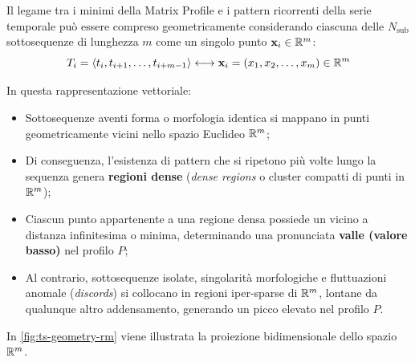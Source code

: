 Il legame tra i minimi della Matrix Profile e i pattern ricorrenti della serie temporale pu\`o essere compreso geometricamente considerando ciascuna delle $N_{\text{sub}}$ sottosequenze di lunghezza $m$ come un singolo punto $\mathbf{x}_i \in \mathbb{R}^m$:
\begin{equation}
T_i = \langle t_i, t_{i+1}, \dots, t_{i+m-1} \rangle \longleftrightarrow \mathbf{x}_i = (x_1, x_2, \dots, x_m) \in \mathbb{R}^m
\end{equation}

In questa rappresentazione vettoriale:
\begin{itemize}
    \item Sottosequenze aventi forma o morfologia identica si mappano in punti geometricamente vicini nello spazio Euclideo $\mathbb{R}^m$;
    \item Di conseguenza, l'esistenza di pattern che si ripetono pi\`u volte lungo la sequenza genera \textbf{regioni dense} (\textit{dense regions} o cluster compatti di punti in $\mathbb{R}^m$);
    \item Ciascun punto appartenente a una regione densa possiede un vicino a distanza infinitesima o minima, determinando una pronunciata \textbf{valle (valore basso)} nel profilo $P$;
    \item Al contrario, sottosequenze isolate, singolarit\`a morfologiche e fluttuazioni anomale (\textit{discords}) si collocano in regioni iper-sparse di $\mathbb{R}^m$, lontane da qualunque altro addensamento, generando un picco elevato nel profilo $P$.
\end{itemize}

In \autoref{fig:ts-geometry-rm} viene illustrata la proiezione bidimensionale dello spazio $\mathbb{R}^m$.

